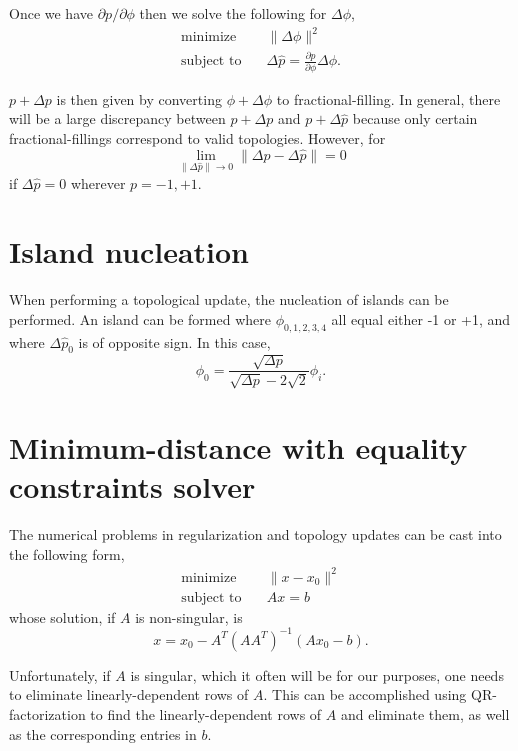 \documentclass{article}
\begin{document}
Once we have $\partial p / \partial \phi$ then we solve the following for $\Delta \phi$,
\begin{align}
    \text{minimize} \quad & \| \Delta \phi \|^2 \\
    \text{subject to} \quad & \Delta \hat{p} = 
        \frac{\partial p}{\partial \phi} \Delta \phi.
\end{align}

$p + \Delta p$ is then given by converting $\phi + \Delta\phi$ to fractional-filling. In general, there will be a large discrepancy between $p + \Delta p$ and $p + \Delta \hat{p}$ because only certain fractional-fillings correspond to valid topologies. However, for 
\begin{equation}
    \lim_{\|\Delta\hat{p}\| \to 0} \|\Delta p - \Delta\hat{p}\| = 0
\end{equation}
if $\Delta\hat{p} = 0$ wherever $p = -1, +1$. 

\section{Island nucleation}
When performing a topological update, the nucleation of islands can be performed. An island can be formed where $\phi_{0,1,2,3,4}$ all equal either -1 or +1, and where $\Delta\hat{p}_0$ is of opposite sign. In this case,
\begin{equation}
\phi_0 = \frac{\sqrt{\Delta p}}{\sqrt{\Delta p} - 2\sqrt{2}} \phi_i.
\end{equation}    



\appendix
\section{Minimum-distance with equality constraints solver}
The numerical problems in regularization and topology updates can be cast into the following form,
\begin{align}
    \text{minimize} \quad & \| x - x_0 \|^2 \\
    \text{subject to} \quad & Ax = b
\end{align}
whose solution, if $A$ is non-singular, is
\begin{equation}
    x = x_0 - A^T (A A^T)^{-1} (A x_0 - b).
\end{equation}

Unfortunately, if $A$ is singular, which it often will be for our purposes, one needs to eliminate linearly-dependent rows of $A$. This can be accomplished using QR-factorization to find the linearly-dependent rows of $A$ and eliminate them, as well as the corresponding entries in $b$.
\end{document}

